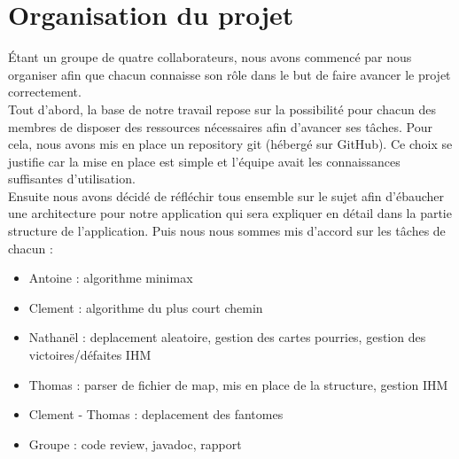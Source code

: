 \section{Organisation du projet}

Étant un groupe de quatre collaborateurs, nous avons commencé par nous organiser afin que chacun connaisse son rôle dans le but de faire avancer le projet correctement. \\
Tout d'abord, la base de notre travail repose sur la possibilité pour chacun des membres de disposer des ressources nécessaires afin d'avancer ses tâches. Pour cela, nous avons mis en place un repository git (hébergé sur GitHub). Ce choix se justifie car la mise en place est simple et l'équipe avait les connaissances suffisantes d'utilisation. \\
Ensuite nous avons décidé de réfléchir tous ensemble sur le sujet afin d'ébaucher une architecture pour notre application qui sera expliquer en détail dans la partie structure de l'application. Puis nous nous sommes mis d'accord sur les tâches de chacun :
\begin{itemize}
	\item Antoine : algorithme minimax
	\item Clement : algorithme du plus court chemin
	\item Nathanël : deplacement aleatoire, gestion des cartes pourries, gestion des victoires/défaites IHM
	\item Thomas : parser de fichier de map, mis en place de la structure, gestion IHM
	\item Clement - Thomas : deplacement des fantomes
	\item Groupe : code review, javadoc, rapport
\end{itemize}